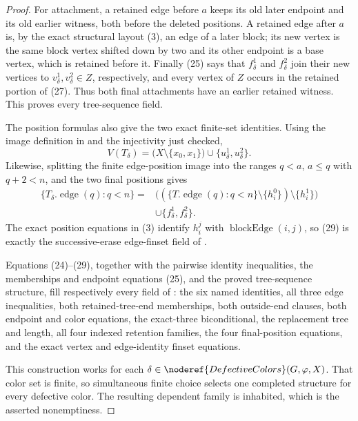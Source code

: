 \begin{proof}
For attachment, a retained edge before $a$ keeps its old later endpoint
and its old earlier witness, both before the deleted positions.  A
retained edge after $a$ is, by the exact structural layout (3), an edge
of a later block; its new vertex is the same block vertex shifted down by
two and its other endpoint is a base vertex, which is retained before it.
Finally (25) says that $f^1_\delta$ and $f^2_\delta$ join their new
vertices to $v^1_\delta,v^2_\delta\in Z$, respectively, and every vertex
of $Z$ occurs in the retained portion of (27).  Thus both final
attachments have an earlier retained witness.  This proves every
tree-sequence field.

The position formulas also give the two exact finite-set identities.
Using the image definition in  and the
injectivity just checked,
\[
 V(T_\delta)=
   \bigl(X\setminus\{x_0,x_1\}\bigr)
       \cup\{u^1_\delta,u^2_\delta\}.                         \tag{28}
\]
Likewise, splitting the finite edge-position image into the ranges
$q<a$, $a\le q$ with $q+2<n$, and the two final positions gives
\[
 \begin{split}
 \{T_\delta.\operatorname{edge}(q):q<n\}
   ={}&\bigl((\{T.\operatorname{edge}(q):q<n\}
              \setminus\{h^0_i\})\setminus\{h^1_i\}\bigr)\\
      &\cup\{f^1_\delta,f^2_\delta\}.                        \tag{29}
 \end{split}
\]
The exact position equations in (3) identify $h^j_i$ with
$\operatorname{blockEdge}(i,j)$, so (29) is exactly the successive-erase
edge-finset field of .

Equations (24)--(29), together with the pairwise identity inequalities,
the memberships and endpoint equations (25), and the proved
tree-sequence structure, fill respectively every field of
: the six named identities, all three
edge inequalities, both retained-tree-end memberships, both outside-end
clauses, both endpoint and color equations, the exact-three
biconditional, the replacement tree and length, all four indexed
retention families, the four final-position equations, and the exact
vertex and edge-identity finset equations.

This construction works for each
$\delta\in\noderef{DefectiveColors}(G,\varphi,X)$.  That color set is
finite, so simultaneous finite choice selects one completed
 structure for every defective color.
The resulting dependent family is inhabited, which is the asserted
nonemptiness.
\end{proof}
